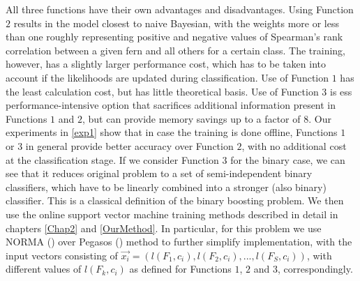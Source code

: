 All three functions have their own advantages and disadvantages. Using Function $2$ results in the model closest to naive Bayesian, with the weights more or less than one roughly representing positive and negative values of Spearman’s rank correlation between a given fern and all others for a certain class. The training, however, has a slightly larger performance cost, which has to be taken into account if the likelihoods are updated during classification. Use of Function $1$ has the least calculation cost, but has little theoretical basis.   Use of Function $3$ is ess performance-intensive option that sacrifices additional information present in Functions $1$ and $2$, but can provide memory savings up to a factor of 8. Our experiments in \ref{exp1} show that in case the training is done offline, Functions $1$ or $3$ in general provide better accuracy over Function $2$, with no additional cost at the classification stage. 
If we consider Function $3$ for the binary case, we can see that it reduces original problem to a set of semi-independent binary classifiers, which have to be linearly combined into a stronger (also binary) classifier. This is a classical definition of the binary boosting problem. We then use the online support vector machine training methods described in detail in chapters \ref{Chap2} and  \ref{OurMethod}. In particular, for this problem we use NORMA (\cite{Norma}) over Pegasos (\cite{Pegasos}) method to further simplify implementation, with the input vectors consisting of $\vec{x_i}=(l(F_1,c_i),l(F_2,c_i),...,l(F_S,c_i))$, with different values of $l(F_k,c_i)$ as defined for Functions $1$, $2$ and $3$, correspondingly. 

